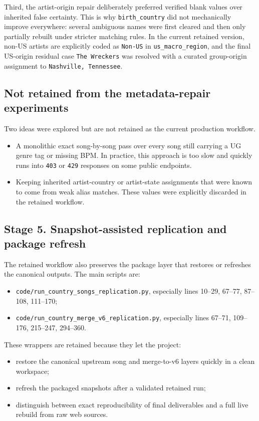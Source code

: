 \documentclass[11pt]{article}
\begin{document}
Third, the artist-origin repair deliberately preferred verified blank values
over inherited false certainty. This is why \texttt{birth\_country} did not
mechanically improve everywhere: several ambiguous names were first cleared and
then only partially rebuilt under stricter matching rules. In the current
retained version, non-US artists are explicitly coded as \texttt{Non-US} in
\texttt{us\_macro\_region}, and the final US-origin residual case
\texttt{The Wreckers} was resolved with a curated group-origin assignment to
\texttt{Nashville, Tennessee}.

\subsection{Not retained from the metadata-repair experiments}
Two ideas were explored but are not retained as the current production
workflow.
\begin{itemize}[leftmargin=2em]
\item A monolithic exact song-by-song pass over every song still carrying a UG
genre tag or missing BPM. In practice, this approach is too slow and quickly
runs into \texttt{403} or \texttt{429} responses on some public endpoints.
\item Keeping inherited artist-country or artist-state assignments that were
known to come from weak alias matches. These values were explicitly discarded in
the retained workflow.
\end{itemize}

\subsection{Stage 5. Snapshot-assisted replication and package refresh}
The retained workflow also preserves the package layer that restores or refreshes
the canonical outputs. The main scripts are:
\begin{itemize}[leftmargin=2em]
\item \texttt{code/run\_country\_songs\_replication.py}, especially lines
10--29, 67--77, 87--108, 111--170;
\item \texttt{code/run\_country\_merge\_v6\_replication.py}, especially lines
67--71, 109--176, 215--247, 294--360.
\end{itemize}

These wrappers are retained because they let the project:
\begin{itemize}[leftmargin=2em]
\item restore the canonical upstream song and merge-to-v6 layers quickly in a
clean workspace;
\item refresh the packaged snapshots after a validated retained run;
\item distinguish between exact reproducibility of final deliverables and a
full live rebuild from raw web sources.
\end{itemize}
\end{document}

